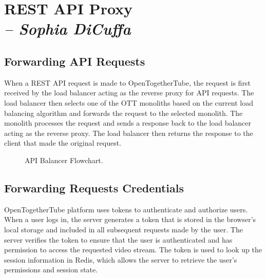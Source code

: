 \chapter{REST API Proxy \\
  \small{\textit{-- Sophia DiCuffa}}
  \label{Chapter::RestApiProxy}}

\section{Forwarding API Requests}
When a REST API request is made to OpenTogetherTube, the request is first received by the load balancer
 acting as the reverse proxy for API requests. The load balancer then selects one of the OTT monoliths based
  on the current load balancing algorithm and forwards the request to the selected monolith. The monolith processes 
  the request and sends a response back to the load balancer acting as the reverse proxy. The load balancer then returns 
  the response to the client that made the original request.

\begin{figure}[!htb]
  \centering
  \caption{\label{Figure::api-balancer} API Balancer Flowchart.}
\end{figure}

\section{Forwarding Requests Credentials}

OpenTogetherTube platform uses tokens to authenticate and authorize users. When a user logs in, the
server generates a token that is stored in the browser's local storage and included in all subsequent requests made
by the user. The server verifies the token to ensure that the user is authenticated and has permission to access the
requested video stream. The token is used to look up the session information in Redis, which allows the server to 
retrieve the user's permissions and session state.